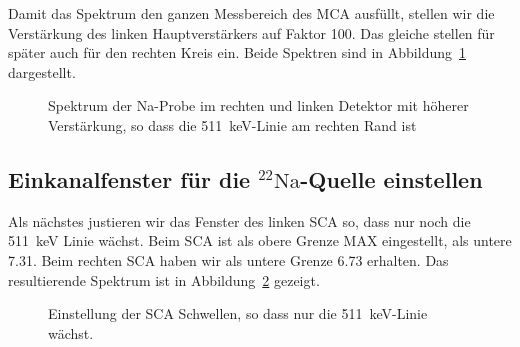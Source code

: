 Damit das Spektrum den ganzen Messbereich des MCA ausfüllt, stellen wir die
Verstärkung des linken Hauptverstärkers auf Faktor 100. Das gleiche stellen für
später auch für den rechten Kreis ein. Beide Spektren sind in
Abbildung~\ref{mca:003_005} dargestellt.

\begin{figure}[htbp]
    \centering
    \hfill
    \caption{%
        Spektrum der Na-Probe im rechten und linken Detektor mit höherer
        Verstärkung, so dass die \SI{511}{\kilo\electronvolt}-Linie am rechten
        Rand ist
    }
    \label{mca:003_005}
\end{figure}

\subsection{Einkanalfenster für die ${}^{22}\text{Na}$-Quelle einstellen}

Als nächstes justieren wir das
Fenster des linken SCA so, dass nur noch die \SI{511}{\kilo\electronvolt} Linie
wächst. Beim SCA ist als obere Grenze MAX eingestellt, als untere \num{7.31}.
Beim rechten SCA haben wir als untere Grenze \num{6.73} erhalten. Das
resultierende Spektrum ist in Abbildung~\ref{mca:fenster} gezeigt.

\begin{figure}[htbp]
    \centering
    \hfill
    \caption{%
        Einstellung der SCA Schwellen, so dass nur die
        \SI{511}{\kilo\electronvolt}-Linie wächst.
    }
    \label{mca:fenster}
\end{figure}

